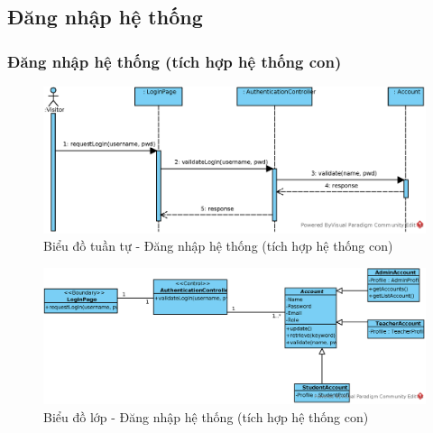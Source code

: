 \documentclass[./../main.tex]{subfiles}
\begin{document}
\subsection{Đăng nhập hệ thống}
\subsubsection{Đăng nhập hệ thống (tích hợp hệ thống con)}
\begin{figure}[H]
	\centering
	\includegraphics[width=\linewidth]{./images/UseCaseDesignDiagram/ucr_ss_login.eps}
	\caption{Biểu đồ tuần tự - Đăng nhập hệ thống (tích hợp hệ thống con)}
\end{figure}
\begin{figure}[H]
	\centering
	\includegraphics[width=\linewidth]{./images/UseCaseDesignDiagram/ucd_ss_login.eps}
	\caption{Biểu đồ lớp - Đăng nhập hệ thống (tích hợp hệ thống con)}
\end{figure}
\end{document}
